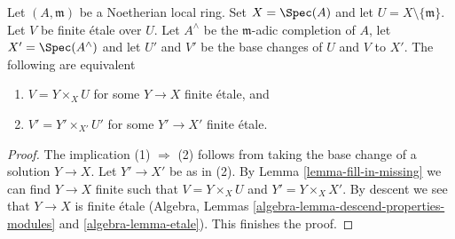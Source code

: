 \begin{lemma}
\label{lemma-purity-and-completion}
Let $(A, \mathfrak m)$ be a Noetherian local ring. Set $X = \Spec(A)$
and let $U = X \setminus \{\mathfrak m\}$.
Let $V$ be finite \'etale over $U$.
Let $A^\wedge$ be the $\mathfrak m$-adic completion of $A$,
let $X' = \Spec(A^\wedge)$ and let $U'$ and $V'$ be the base changes of
$U$ and $V$ to $X'$. The following are equivalent
\begin{enumerate}
\item $V = Y \times_X U$ for some $Y \to X$ finite \'etale, and
\item $V' = Y' \times_{X'} U'$ for some $Y' \to X'$ finite \'etale.
\end{enumerate}
\end{lemma}

\begin{proof}
The implication (1) $\Rightarrow$ (2) follows from taking the base change
of a solution $Y \to X$. Let $Y' \to X'$ be as in (2).
By Lemma \ref{lemma-fill-in-missing} we can find $Y \to X$ finite
such that $V = Y \times_X U$ and $Y' = Y \times_X X'$.
By descent we see that $Y \to X$ is finite \'etale
(Algebra, Lemmas \ref{algebra-lemma-descend-properties-modules} and
\ref{algebra-lemma-etale}). This finishes the proof.
\end{proof}
